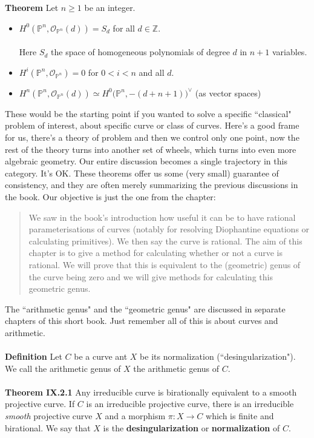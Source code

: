 \documentclass[12pt]{article}
\begin{document}
\textbf{Theorem} Let $n\geq 1$ be an integer. 
\begin{itemize}
\item $H^0(\mathbb{P}^n, \mathcal{O}_{\mathbb{P}^n} (d) ) = S_d $ for all $d \in \mathbb{Z}$. \\ \\ Here $S_d$ the space of homogeneous polynomials of degree $d$ in $n+1$ variables.    
\item $H^i(\mathbb{P}^n, \mathcal{O}_{\mathbb{P}^n})=0$ for $0 < i < n$ and all $d$.
\item $H^n(\mathbb{P}^n, \mathcal{O}_{\mathbb{P}^n}(d) ) \simeq H^0\big(\mathbb{P}^n, - (d+n+1) \big)^{\vee} $ (as vector spaces)
\end{itemize}
These would be the starting point if you wanted to solve a specific ``classical" problem of interest, about specific curve or class of curves.  Here's a good frame for us, there's a theory of problem and then we control only one point, now the rest of the theory turns into another set of wheels, which turns into even more algebraic geometry.  Our entire discussion becomes a single trajectory in this category. It's OK. 
\newpage
\noindent These theorems offer us some (very small) guarantee of consistency, and they are often merely summarizing the previous discussions in the book.  Our objective is just the one from the chapter:
\begin{quotation}
\noindent We saw in the book’s introduction how useful it can be to have rational
parameterisations of curves (notably for resolving Diophantine equations or
calculating primitives). We then say the curve is rational. The aim of this
chapter is to give a method for calculating whether or not a curve is rational.
We will prove that this is equivalent to the (geometric) genus of the curve
being zero and we will give methods for calculating this geometric genus.
\end{quotation}
The ``arithmetic genus" and the ``geometric genus" are discussed in separate chapters of this short book.  Just remember all of this is about curves and arithmetic.  \\ \\
\textbf{Definition} Let $C$ be a curve ant $X$ be its normalization (``desingularization").  We call the arithmetic genus of $X$ the arithmetic genus of $C$. \\ \\
\textbf{Theorem IX.2.1} Any irreducible curve is birationally equivalent to a smooth projective curve.  If $C$ is an irreducible projective curve, there is an irreducible \textit{smooth} projective curve $X$ and a morphism $ \pi: X \to C$ which is finite and birational.  We say that $X$ is the \textbf{desingularization} or \textbf{normalization} of $C$. \\ \\
\end{document}
